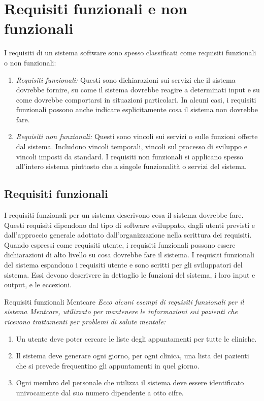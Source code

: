 \section{Requisiti funzionali e non funzionali}
I requisiti di un sistema software sono spesso classificati come requisiti funzionali o non funzionali:
\begin{enumerate}
    \item \textit{Requisiti funzionali:} Questi sono dichiarazioni sui servizi che il sistema dovrebbe fornire, su come il sistema dovrebbe reagire a determinati input e su come dovrebbe comportarsi in situazioni particolari. In alcuni casi, i requisiti funzionali possono anche indicare esplicitamente cosa il sistema non dovrebbe fare.
    \item \textit{Requisiti non funzionali:} Questi sono vincoli sui servizi o sulle funzioni offerte dal sistema. Includono vincoli temporali, vincoli sul processo di sviluppo e vincoli imposti da standard. I requisiti non funzionali si applicano spesso all'intero sistema piuttosto che a singole funzionalità o servizi del sistema.
\end{enumerate}

\subsection{Requisiti funzionali}
I requisiti funzionali per un sistema descrivono cosa il sistema dovrebbe fare. Questi requisiti dipendono dal tipo di software sviluppato, dagli utenti previsti e dall'approccio generale adottato dall'organizzazione nella scrittura dei requisiti. Quando espressi come requisiti utente, i requisiti funzionali possono essere dichiarazioni di alto livello su cosa dovrebbe fare il sistema. I requisiti funzionali del sistema espandono i requisiti utente e sono scritti per gli sviluppatori del sistema. Essi devono descrivere in dettaglio le funzioni del sistema, i loro input e output, e le eccezioni.

\begin{Example}{Requisiti funzionali Mentcare}{}
\textit{Ecco alcuni esempi di requisiti funzionali per il sistema Mentcare, utilizzato per mantenere le informazioni sui pazienti che ricevono trattamenti per problemi di salute mentale:}
\begin{enumerate}
    \item Un utente deve poter cercare le liste degli appuntamenti per tutte le cliniche.
    \item Il sistema deve generare ogni giorno, per ogni clinica, una lista dei pazienti che si prevede frequentino gli appuntamenti in quel giorno.
    \item Ogni membro del personale che utilizza il sistema deve essere identificato univocamente dal suo numero dipendente a otto cifre.
\end{enumerate}
\end{Example}

